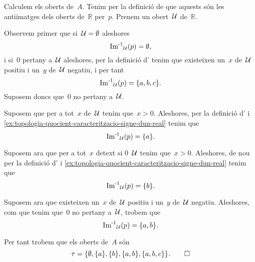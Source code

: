 \documentclass[../../main.tex]{subfiles}
\begin{document}
    \begin{solution}
        Calculem els oberts de~\(A\).
        Tenim per la definició de  que aquests són les antiimatges dels oberts de~\(\mathbb{R}\) per~\(p\).
        Prenem un obert~\(\mathcal{U}\) de~\(\mathbb{R}\).

        Observem primer que si~\(\mathcal{U}=\emptyset\) aleshores
        \[
            \operatorname{\operatorname{Im}^{-1}}_{\mathcal{U}}(p)=\emptyset,
        \]
        i si~\(0\) pertany a~\(\mathcal{U}\) aleshores, per la definició d' tenim que existeixen un~\(x\) de~\(\mathcal{U}\) positiu i un~\(y\) de~\(\mathcal{U}\) negatiu, i per tant
        \[
            \operatorname{\operatorname{Im}^{-1}}_{\mathcal{U}}(p)=\{a,b,c\}.
        \]
        Suposem doncs que~\(0\) no pertany a~\(\mathcal{U}\).

        Suposem que per a tot~\(x\) de~\(\mathcal{U}\) tenim que~\(x>0\).
        Aleshores, per la definició d' i \eqref{ex:topologia-quocient-caracteritzacio-signe-dun-real} tenim que
        \[
            \operatorname{\operatorname{Im}^{-1}}_{\mathcal{U}}(p)=\{a\}.
        \]

        Suposem ara que per a tot~\(x\) detext{ si }0~\(\mathcal{U}\) tenim que~\(x>0\).
        Aleshores, de nou per la definició d' i \eqref{ex:topologia-quocient-caracteritzacio-signe-dun-real} tenim que
        \[
            \operatorname{\operatorname{Im}^{-1}}_{\mathcal{U}}(p)=\{b\}.
        \]

        Suposem ara que existeixen un~\(x\) de~\(\mathcal{U}\) positiu i un~\(y\) de~\(\mathcal{U}\) negatiu.
        Aleshores, com que tenim que~\(0\) no pertany a~\(\mathcal{U}\), trobem que
        \[
            \operatorname{\operatorname{Im}^{-1}}_{\mathcal{U}}(p)=\{a,b\}.
        \]

        Per tant trobem que els oberts de~\(A\) són
        \[
            \tau=\{\emptyset,\{a\},\{b\},\{a,b\},\{a,b,c\}\}.\qedhere
        \]
    \end{solution}
\end{document}

